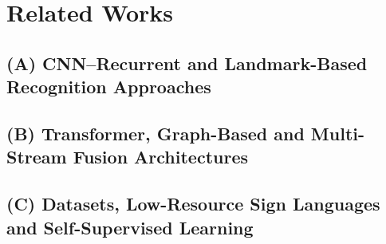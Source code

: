 \chapter{Related Works}
\label{ch:related}


\section[(A) CNN--Recurrent and Landmark-Based Recognition]{(A) CNN--Recurrent and Landmark-Based Recognition Approaches}
\label{sec:rw-a}

\section[(B) Transformer, Graph-Based and Multi-Stream Architectures]{(B) Transformer, Graph-Based and Multi-Stream Fusion Architectures}
\label{sec:rw-b}

\section[(C) Datasets, Low-Resource Languages and Self-Supervision]{(C) Datasets, Low-Resource Sign Languages and Self-Supervised Learning}
\label{sec:rw-c}

